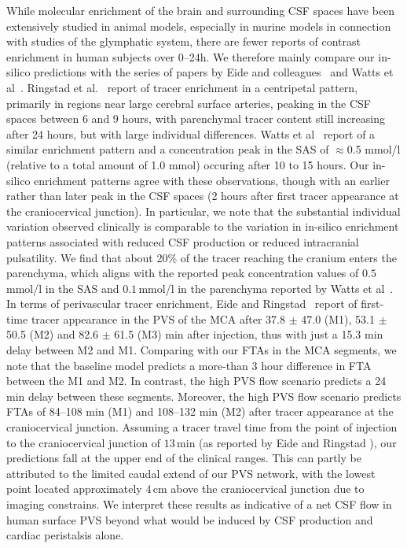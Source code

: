 \documentclass[fleqn,10pt]{wlscirep}
\begin{document}
While molecular enrichment of the brain and surrounding CSF spaces
have been extensively studied in animal models, especially in murine
models in connection with studies of the glymphatic system, there are
fewer reports of contrast enrichment in human subjects over 0--24h. We
therefore mainly compare our in-silico predictions with the series of
papers by Eide and colleagues~\cite{ringstad2017glymphatic,
  ringstad2018brain, eide2021sleep, eide2024functional} and Watts et
al~\cite{watts2019measuring}. Ringstad et al.~\cite{ringstad2018brain}
report of tracer enrichment in a centripetal pattern, primarily in
regions near large cerebral surface arteries, peaking in the CSF
spaces between 6 and 9 hours, with parenchymal tracer content still
increasing after 24 hours, but with large individual
differences. Watts et al~\cite{watts2019measuring} report of a similar
enrichment pattern and a concentration peak in the SAS of $\approx$0.5
mmol/l (relative to a total amount of 1.0 mmol) occuring after 10 to 15 hours. Our in-silico enrichment
patterns agree with these observations, though with an earlier rather than later peak in the CSF spaces (2 hours after first tracer appearance at the craniocervical junction). In particular, we note that the substantial individual variation observed clinically is comparable to the variation in in-silico enrichment patterns associated with reduced CSF production or reduced intracranial pulsatility. We find that about 20\% of the tracer reaching the cranium enters the parenchyma, which aligns with the reported peak concentration values of $0.5\,$mmol/l in the SAS and $0.1\,$mmol/l in the parenchyma reported by Watts et al~\cite{watts2019measuring}.
In terms of perivascular tracer
enrichment, Eide and Ringstad~\cite{eide2024functional} report of
first-time tracer appearance in the PVS of the MCA after 37.8 $\pm$
47.0 (M1), 53.1 $\pm$ 50.5 (M2) and 82.6 $\pm$ 61.5 (M3) min after injection, thus with just a 15.3 min delay between M2 and M1. Comparing with our FTAs in the MCA segments, we note that the baseline model predicts a more-than 3 hour difference in FTA between the M1 and M2. In contrast, the high PVS flow scenario predicts a 24 min delay between these segments.
Moreover, the high PVS flow scenario predicts FTAs of
84--108 min (M1) and 108--132 min (M2) after tracer appearance at the craniocervical junction.
Assuming a tracer travel time from the point of injection to the craniocervical junction of $13\,$min (as reported by Eide and Ringstad \cite{eide2024functional}), our predictions fall at the upper end of the clinical ranges. This can partly be attributed to the limited caudal extend of our PVS network, with the lowest point located approximately $4\,$cm above the craniocervical junction due to imaging constrains.
We interpret these results as indicative of a net CSF flow in human surface PVS beyond what would be induced by CSF production and cardiac peristalsis alone.
\end{document}
